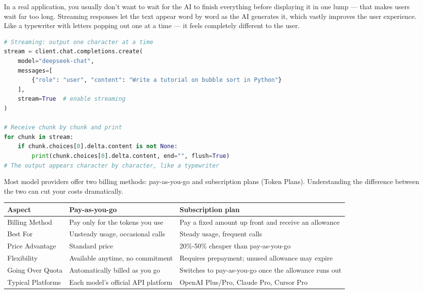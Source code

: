 
In a real application, you usually don't want to wait for the AI to finish everything before displaying it in one lump — that makes users wait far too long. Streaming responses let the text appear word by word as the AI generates it, which vastly improves the user experience. Like a typewriter with letters popping out one at a time — it feels completely different to the user.

\begin{lstlisting}[language=Python]
# Streaming: output one character at a time
stream = client.chat.completions.create(
    model="deepseek-chat",
    messages=[
        {"role": "user", "content": "Write a tutorial on bubble sort in Python"}
    ],
    stream=True  # enable streaming
)

# Receive chunk by chunk and print
for chunk in stream:
    if chunk.choices[0].delta.content is not None:
        print(chunk.choices[0].delta.content, end="", flush=True)
# The output appears character by character, like a typewriter
\end{lstlisting}


Most model providers offer two billing methods: pay-as-you-go and subscription plans (Token Plans). Understanding the difference between the two can cut your costs dramatically.


\begin{center}
\begin{tabularx}{\linewidth}{|X|X|X|}
\hline
\textbf{Aspect} & \textbf{Pay-as-you-go} & \textbf{Subscription plan} \tabularnewline
\hline
Billing Method & Pay only for the tokens you use & Pay a fixed amount up front and receive an allowance \tabularnewline
Best For & Unsteady usage, occasional calls & Steady usage, frequent calls \tabularnewline
Price Advantage & Standard price & 20\%-50\% cheaper than pay-as-you-go \tabularnewline
Flexibility & Available anytime, no commitment & Requires prepayment; unused allowance may expire \tabularnewline
Going Over Quota & Automatically billed as you go & Switches to pay-as-you-go once the allowance runs out \tabularnewline
Typical Platforms & Each model's official API platform & OpenAI Plus/Pro, Claude Pro, Cursor Pro \tabularnewline
\hline
\end{tabularx}
\end{center}

